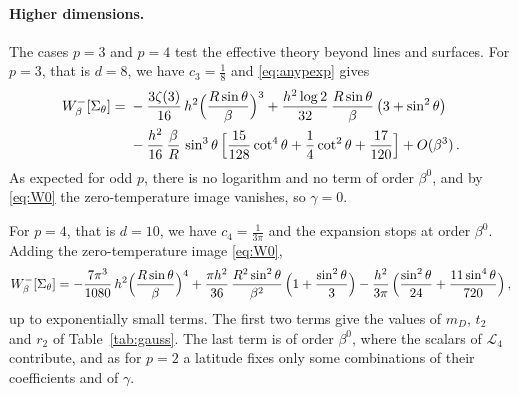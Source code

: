 \documentclass[a4paper,11pt]{article}
\begin{document}
	\paragraph{Higher dimensions.}
	The cases $p=3$ and $p=4$ test the effective theory beyond lines and surfaces. For $p=3$, that is $d=8$, we have $c_3=\tfrac18$ and \eqref{eq:anypexp} gives
	\begin{equation}
		\begin{aligned}
			W^-_\beta[\Sigma_\theta]={}&-\frac{3\zeta(3)}{16}\,h^2\Bigl(\frac{R\sin\theta}{\beta}\Bigr)^{3}+\frac{h^2\log2}{32}\,\frac{R\sin\theta}{\beta}\,\bigl(3+\sin^2\theta\bigr)\\
			&-\frac{h^2}{16}\,\frac{\beta}{R}\,\sin^3\theta\,\Bigl[\frac{15}{128}\cot^4\theta+\frac14\cot^2\theta+\frac{17}{120}\Bigr]+O(\beta^3)\, .
		\end{aligned}
	\end{equation}
	As expected for odd $p$, there is no logarithm and no term of order $\beta^0$, and by \eqref{eq:W0} the zero-temperature image vanishes, so $\gamma=0$. 
	
	For $p=4$, that is $d=10$, we have $c_4=\tfrac{1}{3\pi}$ and the expansion stops at order $\beta^0$. Adding the zero-temperature image \eqref{eq:W0},
	\begin{equation}
		W^-_\beta[\Sigma_\theta]=-\frac{7\pi^3}{1080}\,h^2\Bigl(\frac{R\sin\theta}{\beta}\Bigr)^{4}+\frac{\pi h^2}{36}\,\frac{R^2\sin^2\theta}{\beta^2}\,\Bigl(1+\frac{\sin^2\theta}{3}\Bigr)-\frac{h^2}{3\pi}\,\Bigl(\frac{\sin^2\theta}{24}+\frac{11\sin^4\theta}{720}\Bigr)\, ,
	\end{equation}
	up to exponentially small terms. The first two terms give the values of $m_D$, $t_2$ and $r_2$ of Table~\ref{tab:gauss}. The last term is of order $\beta^0$, where the scalars of $\mathcal{L}_4$ contribute, and as for $p=2$ a latitude fixes only some combinations of their coefficients and of $\gamma$.
	
\end{document}
